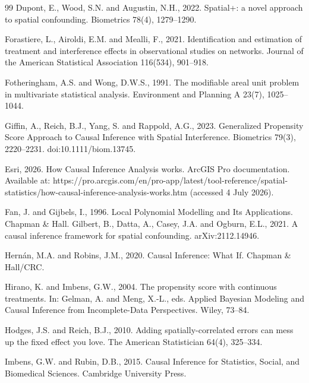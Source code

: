 \documentclass{article}
\begin{document}
\begin{thebibliography}{99}
Dupont, E., Wood, S.N. and Augustin, N.H., 2022. Spatial+: a novel approach to spatial confounding. Biometrics 78(4), 1279--1290.

Forastiere, L., Airoldi, E.M. and Mealli, F., 2021. Identification and estimation of treatment and interference effects in observational studies on networks. Journal of the American Statistical Association 116(534), 901--918.

Fotheringham, A.S. and Wong, D.W.S., 1991. The modifiable areal unit problem in multivariate statistical analysis. Environment and Planning A 23(7), 1025--1044.

Giffin, A., Reich, B.J., Yang, S. and Rappold, A.G., 2023. Generalized Propensity Score Approach to Causal Inference with Spatial Interference. Biometrics 79(3), 2220--2231. doi:10.1111/biom.13745.

Esri, 2026. How Causal Inference Analysis works. ArcGIS Pro documentation. Available at: https://pro.arcgis.com/en/pro-app/latest/tool-reference/spatial-statistics/how-causal-inference-analysis-works.htm (accessed 4 July 2026).

Fan, J. and Gijbels, I., 1996. Local Polynomial Modelling and Its Applications. Chapman \& Hall.
Gilbert, B., Datta, A., Casey, J.A. and Ogburn, E.L., 2021. A causal inference framework for spatial confounding. arXiv:2112.14946.

Hern\'an, M.A. and Robins, J.M., 2020. Causal Inference: What If. Chapman \& Hall/CRC.

Hirano, K. and Imbens, G.W., 2004. The propensity score with continuous treatments. In: Gelman, A. and Meng, X.-L., eds. Applied Bayesian Modeling and Causal Inference from Incomplete-Data Perspectives. Wiley, 73--84.

Hodges, J.S. and Reich, B.J., 2010. Adding spatially-correlated errors can mess up the fixed effect you love. The American Statistician 64(4), 325--334.

Imbens, G.W. and Rubin, D.B., 2015. Causal Inference for Statistics, Social, and Biomedical Sciences. Cambridge University Press.


\end{thebibliography}
\end{document}
